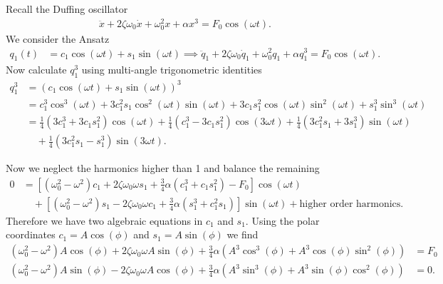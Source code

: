 \begin{ex}
	Recall the Duffing oscillator
\begin{align}
	\ddot{x} + 2 \zeta \omega_0 \dot{x} + \omega_0^2  x + \alpha x^3 = F_0 \cos(\omega t).
\end{align}
We consider the Ansatz 
\begin{align}
	q_1(t) &= c_1 \cos(\omega t) + s_1 \sin(\omega t) \implies
	\ddot{q}_1 + 2 \zeta \omega_0 \dot{q}_1 + \omega_0^2 q_{1} + \alpha q_{1}^{3} = F_0 \cos(\omega t). 
\end{align}
Now calculate $q_1^3$ using multi-angle trigonometric identities
\begin{subequations}
 \begin{align}
	 q_1^{3} &= \left( c_1 \cos (\omega t) + s_1 \sin(\omega t)\right)^{3} \\
		 &= c_{1}^{3} \cos^{3}(\omega t) + 3 c_1^2 s_1 \cos^{2}(\omega t)\sin(\omega t) + 3 c_1 s_{1}^{2}\cos(\omega t) \sin^2(\omega t) +s_1^{3}\sin^{3}(\omega t) \\
		 &= \frac{1}{4} \left(3 c_1^3 + 3 c_1 s_1^2\right) \cos(\omega t) + \frac{1}{4} \left(c_1^3 - 3 c_1 s_1^2\right) \cos(3 \omega t) + \frac{1}{4} \left(3 c_1^2 s_1 + 3 s_1^3\right) \sin(\omega t) \\
		 &\quad + \frac{1}{4} \left(3 c_1^2 s_1 - s_1^3\right) \sin(3 \omega t). 
\end{align}
\end{subequations}
\end{ex}
Now we neglect the harmonics higher than 1 and balance the remaining
\begin{subequations}
\begin{align}
	0&=	\left[\left(\omega _0^2 - \omega^2\right) c_1 + 2 \zeta \omega_0 \omega s_1 + \frac{3}{4} \alpha \left(c_1^3 + c_1 s_1^2\right) - F_0 \right] \cos(\omega t)  \\
	 &\quad + \left[ \left( \omega_0^2 - \omega^2 \right) s_1 - 2 \zeta \omega_0 \omega c_1 + \frac{3}{4} \alpha \left(s_1^3 + c_1^2 s_1\right) \right] \sin(\omega t) +  \textrm{higher order harmonics}.  
\end{align}
\end{subequations}
Therefore we have two algebraic equations in $c_1$ and $s_1$. Using the polar coordinates $c_1 = A \cos(\phi)$ and $s_1 = A \sin(\phi)$ we find
\begin{subequations}
\begin{align}
	\left( \omega _0^2 - \omega ^2\right) A \cos(\phi) + 2 \zeta \omega_0 \omega A \sin (\phi) + \frac{3}{4} \alpha \left( A^3 \cos^3(\phi) + A^3 \cos(\phi) \sin^2(\phi) \right) &= F_0\\
	\left( \omega _0^2 - \omega ^2\right) A \sin(\phi) -  2 \zeta \omega_0 \omega A \cos (\phi) + \frac{3}{4} \alpha \left( A^3 \sin^3(\phi) + A^3 \sin(\phi) \cos^2(\phi) \right) &= 0.
\end{align}
\end{subequations}
